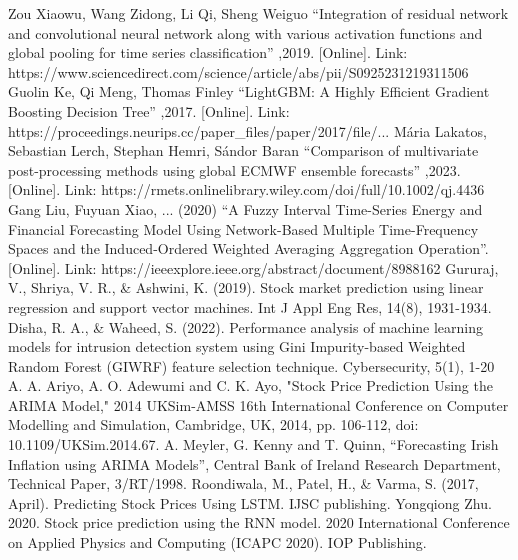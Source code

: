 \documentclass[conference]{IEEEtran}
\begin{document}
\begin{thebibliography}{00}
 Zou Xiaowu, Wang Zidong, Li Qi, Sheng Weiguo ``Integration of residual network and convolutional neural network along with various activation functions and global pooling for time series classification'' ,2019. [Online]. Link: https://www.sciencedirect.com/science/article/abs/pii/S0925231219311506
 Guolin Ke, Qi Meng, Thomas Finley ``LightGBM: A Highly Efficient Gradient Boosting Decision Tree'' ,2017. [Online]. Link: https://proceedings.neurips.cc/paper\_files/paper/2017/file/...
 Mária Lakatos, Sebastian Lerch, Stephan Hemri, Sándor Baran ``Comparison of multivariate post-processing methods using global ECMWF ensemble forecasts'' ,2023. [Online]. Link: https://rmets.onlinelibrary.wiley.com/doi/full/10.1002/qj.4436
 Gang Liu, Fuyuan Xiao, ... (2020) ``A Fuzzy Interval Time-Series Energy and Financial Forecasting Model Using Network-Based Multiple Time-Frequency Spaces and the Induced-Ordered Weighted Averaging Aggregation Operation''.[Online]. Link: https://ieeexplore.ieee.org/abstract/document/8988162
 Gururaj, V., Shriya, V. R., \& Ashwini, K. (2019). Stock market prediction using linear regression and support vector machines. Int J Appl Eng Res, 14(8), 1931-1934.
 Disha, R. A., \& Waheed, S. (2022). Performance analysis of machine learning models for intrusion detection system using Gini Impurity-based Weighted Random Forest (GIWRF) feature selection technique. Cybersecurity, 5(1), 1-20
 A. A. Ariyo, A. O. Adewumi and C. K. Ayo, "Stock Price Prediction Using the ARIMA Model," 2014 UKSim-AMSS 16th International Conference on Computer Modelling and Simulation, Cambridge, UK, 2014, pp. 106-112, doi: 10.1109/UKSim.2014.67.
 A. Meyler, G. Kenny and T. Quinn, “Forecasting Irish Inflation using ARIMA Models”, Central Bank of Ireland Research Department, Technical Paper, 3/RT/1998.
 Roondiwala, M., Patel, H., \& Varma, S. (2017, April). Predicting Stock Prices Using LSTM. IJSC publishing.
	Yongqiong Zhu. 2020. Stock price prediction using the RNN model. 2020 International Conference on Applied Physics and Computing (ICAPC 2020). IOP Publishing.
\end{thebibliography}
\end{document}
